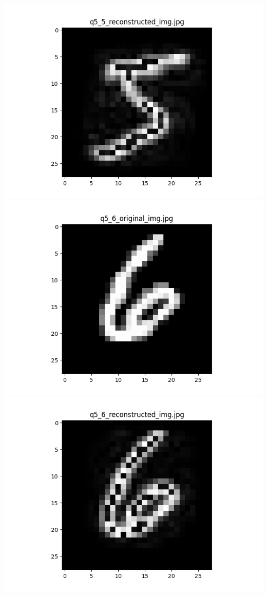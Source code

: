 \documentclass{article}
\begin{document}
    \includegraphics[scale=.6]{../results/q5/reconstrcuted/q5_5_reconstructed.png}
    \\
    \includegraphics[scale=.6]{../results/q5/original/q5_6_original.png}
    \includegraphics[scale=.6]{../results/q5/reconstrcuted/q5_6_reconstructed.png}
\end{document}
